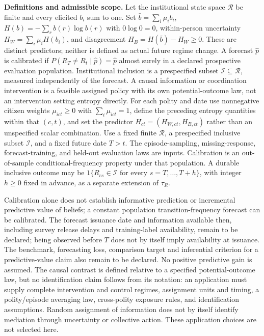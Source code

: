 \documentclass[11pt,a4paper]{article}
\begin{document}
\textbf{Definitions and admissible scope.} Let the institutional state space \(\mathcal R\) be finite and every elicited \(b_i\) sum to one. Set \(\bar b=\sum_i\mu_i b_i\), \(H(b)=-\sum_r b(r)\log b(r)\) with \(0\log0=0\), within-person uncertainty \(H_W=\sum_i\mu_iH(b_i)\), and disagreement \(H_B=H(\bar b)-H_W\ge0\). These are distinct predictors; neither is defined as actual future regime change. A forecast \(\widehat p\) is calibrated if \(P(R_T\ne R_t\mid\widehat p)=\widehat p\) almost surely in a declared prospective evaluation population. Institutional inclusion is a prespecified subset \(\mathcal I\subseteq\mathcal R\), measured independently of the forecast. A causal information or coordination intervention is a feasible assigned policy with its own potential-outcome law, not an intervention setting entropy directly. For each polity and date use nonnegative citizen weights \(\mu_{ict}\ge0\) with \(\sum_i\mu_{ict}=1\), define the preceding entropy quantities within that \((c,t)\), and set the predictor \(H_{ct}=(H_{W,ct},H_{B,ct})\) rather than an unspecified scalar combination. Use a fixed finite \(\mathcal R\), a prespecified inclusive subset \(\mathcal I\), and a fixed future date \(T>t\). The episode-sampling, missing-response, forecast-training, and held-out evaluation laws are inputs. Calibration is an out-of-sample conditional-frequency property under that population. A durable inclusive outcome may be \(1\{R_{cs}\in\mathcal I\text{ for every }s=T,\ldots,T+h\}\), with integer \(h\ge0\) fixed in advance, as a separate extension of \(\tau_R\).

Calibration alone does not establish informative prediction or incremental predictive value of beliefs; a constant population transition-frequency forecast can be calibrated. The forecast issuance date and information available then, including survey release delays and training-label availability, remain to be declared; being observed before \(T\) does not by itself imply availability at issuance. The benchmark, forecasting loss, comparison target and inferential criterion for a predictive-value claim also remain to be declared. No positive predictive gain is assumed. The causal contrast is defined relative to a specified potential-outcome law, but no identification claim follows from its notation: an application must supply complete intervention and control regimes, assignment units and timing, a polity/episode averaging law, cross-polity exposure rules, and identification assumptions. Random assignment of information does not by itself identify mediation through uncertainty or collective action. These application choices are not selected here.
\end{document}
